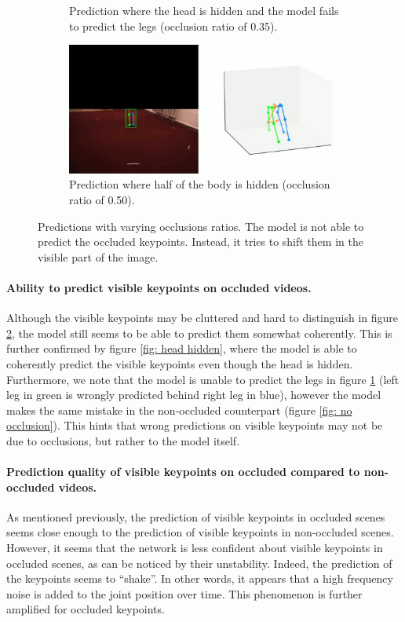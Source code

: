 \documentclass[runningheads]{llncs}
\begin{document}
\begin{figure}[ht]
\begin{subfigure}[t]{0.49\textwidth}
    \caption{Prediction where the head is hidden and the model fails to predict the legs (occlusion ratio of 0.35).}
    \label{fig: head hidden comp}
  \end{subfigure}
  \hfill
  \begin{subfigure}[t]{0.49\textwidth}
    \centering
    \includegraphics[width=\textwidth]{assets/pred_spider.png}
    \caption{Prediction where half of the body is hidden (occlusion ratio of 0.50).}
    \label{fig: spider}
  \end{subfigure}
  \caption{Predictions with varying occlusions ratios. The model is not able to predict the occluded keypoints. Instead, it tries to shift them in the visible part of the image.}
  \label{fig: predictions varying occlusion ratios}
\end{figure}
\paragraph{Ability to predict visible keypoints on occluded videos.}
Although the visible keypoints may be cluttered and hard to distinguish in figure \ref{fig: spider}, the model still seems to be able to predict them somewhat coherently. This is further confirmed by figure \ref{fig: head hidden}, where the model is able to coherently predict the visible keypoints even though the head is hidden. Furthermore, we note that the model is unable to predict the legs in figure \ref{fig: head hidden comp} (left leg in green is wrongly predicted behind right leg in blue), however the model makes the same mistake in the non-occluded counterpart (figure \ref{fig: no occlusion}). This hints that wrong predictions on visible keypoints may not be due to occlusions, but rather to the model itself.
\paragraph{Prediction quality of visible keypoints on occluded compared to non-occluded videos.}
As mentioned previously, the prediction of visible keypoints in occluded scenes seems close enough to the prediction of visible keypoints in non-occluded scenes. However, it seems that the network is less confident about visible keypoints in occluded scenes, as can be noticed by their unstability. Indeed, the prediction of the keypoints seems to ``shake''. In other words, it appears that a high frequency noise is added to the joint position over time. This phenomenon is further amplified for occluded keypoints.
\end{document}
